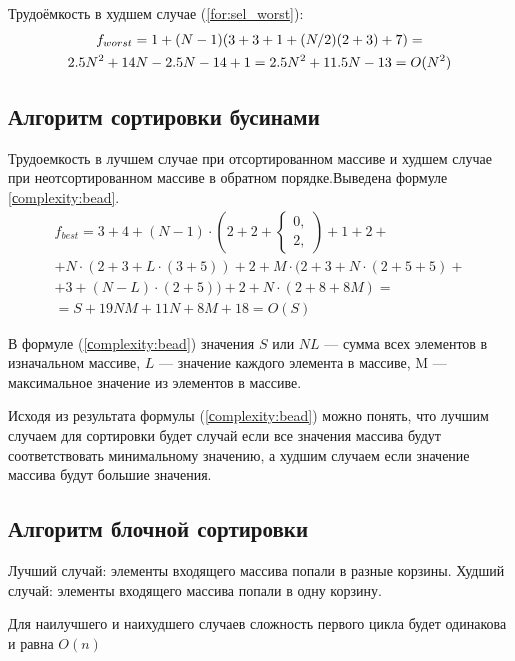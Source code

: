 Трудоёмкость в худшем случае (\ref{for:sel_worst}):
\begin{gather}
	\label{for:sel_worst}
	f_{worst} = 1 + (N - 1)(3 + 3 + 1 + (N / 2)(2 + 3) + 7) = \notag
	\\ 2.5N^2 + 14N - 2.5N - 14 + 1 = 2.5N^2 + 11.5N - 13 = O(N^2)
\end{gather}

\subsection{Алгоритм сортировки бусинами}

Трудоемкость в лучшем случае при отсортированном массиве и худшем случае при неотсортированном массиве в обратном порядке.Выведена формуле \ref{сomplexity:bead}.
\begin{equation}
	\label{сomplexity:bead}
	\begin{gathered}
		f_{best} = 3 + 4 + (N - 1) \cdot (2 + 2 + 
		\begin{cases}
			0, \\
			2,
		\end{cases}) 
		+ 1 + 2 + \\
		+ N \cdot (2 + 3 + L \cdot (3 + 5)) + 2 + M \cdot (2 + 3 + N \cdot (2 + 5 + 5) + \\
		+3 + (N - L) \cdot (2 + 5)) + 2 + N \cdot (2 + 8 + 8M) = \\
		= S + 19NM + 11N + 8M + 18 = O(S)
	\end{gathered}
\end{equation}

В формуле (\ref{сomplexity:bead}) значения $S$ или $NL$ --- сумма всех элементов в изначальном массиве, $L$ --- значение каждого элемента в массиве,  M --- максимальное значение из элементов в массиве.

Исходя из результата формулы (\ref{сomplexity:bead}) можно понять, что лучшим случаем для сортировки будет случай если все значения массива будут соответствовать минимальному значению, а худшим случаем если значение массива будут большие значения. 

\subsection{Алгоритм блочной сортировки} 
Лучший случай: элементы входящего массива попали в разные корзины.
Худший случай: элементы входящего массива попали в одну корзину.

Для наилучшего и наихудшего случаев сложность первого цикла будет одинакова и равна $O(n)$

